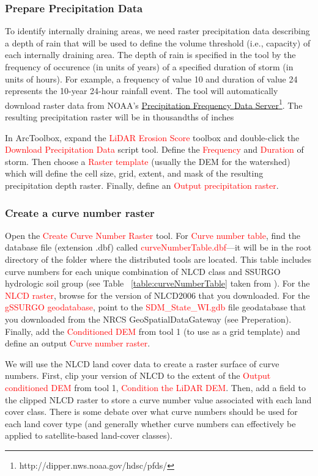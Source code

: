 \documentclass{article}
\newcommand{\toolPar}[1]{\textcolor{red}{#1}}
\begin{document}
		\subsubsection{Prepare Precipitation Data}
			To identify internally draining areas, we need raster precipitation data describing a depth of rain that will be used to define the volume threshold (i.e., capacity) of each internally draining area. The depth of rain is specified in the tool by the frequency of occurence (in units of years) of a specified duration of storm (in units of hours). For example, a frequency of value 10 and duration of value 24 represents the 10-year 24-hour rainfall event. The tool will automatically download raster data from NOAA's \href{http://dipper.nws.noaa.gov/hdsc/pfds/}{Precipitation Frequency Data Server}\footnote{http://dipper.nws.noaa.gov/hdsc/pfds/}. The resulting precipitation raster will be in thousandths of inches
		
			In ArcToolbox, expand the \toolPar{LiDAR Erosion Score} toolbox and double-click the \toolPar{Download Precipitation Data} script tool. Define the \toolPar{Frequency} and \toolPar{Duration} of storm. Then choose a \toolPar{Raster template} (usually the DEM for the watershed) which will define the cell size, grid, extent, and mask of the resulting precipitation depth raster. Finally, define an \toolPar{Output precipitation raster}.
		\subsubsection{Create a curve number raster}
			Open the \toolPar{Create Curve Number Raster} tool. For \toolPar{Curve number table}, find the database file (extension .dbf) called \toolPar{curveNumberTable.dbf}---it will be in the root directory of the folder where the distributed tools are located. This table includes curve numbers for each unique combination of NLCD class and SSURGO hydrologic soil group (see Table ~\ref{table:curveNumberTable} taken from \cite{mcenroe_storm_2003}). For the \toolPar{NLCD raster}, browse for the version of NLCD2006 that you downloaded. For the \toolPar{gSSURGO geodatabase}, point to the \toolPar{SDM\_State\_WI.gdb} file geodatabase that you downloaded from the NRCS GeoSpatialDataGateway (see Preperation). Finally, add the \toolPar{Conditioned DEM} from tool 1 (to use as a grid template) and define an output \toolPar{Curve number raster}.
			
			We will use the NLCD land cover data to create a raster surface of curve numbers. First, clip your version of NLCD to the extent of the \toolPar{Output conditioned DEM} from tool 1, \toolPar{Condition the LiDAR DEM}. Then, add a field to the clipped NLCD raster to store a curve number value associated with each land cover class. There is some debate over what curve numbers should be used for each land cover type (and generally whether curve numbers can effectively be applied to satellite-based land-cover classes).
\end{document}
